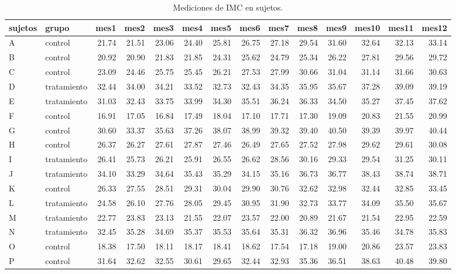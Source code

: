 \documentclass[]{article}
\begin{document}
\begin{table}[ht]
\centering
{\tiny
\begin{tabular}{llrrrrrrrrrrrr}
  \hline
sujetos & grupo & mes1 & mes2 & mes3 & mes4 & mes5 & mes6 & mes7 & mes8 & mes9 & mes10 & mes11 & mes12 \\ 
  \hline
A & control & 21.74 & 21.51 & 23.06 & 24.40 & 25.81 & 26.75 & 27.18 & 29.54 & 31.60 & 32.64 & 32.13 & 33.14 \\ 
  B & control & 20.92 & 20.90 & 21.83 & 21.85 & 24.31 & 25.62 & 24.79 & 25.34 & 26.22 & 27.81 & 29.56 & 29.72 \\ 
  C & control & 23.09 & 24.46 & 25.75 & 25.45 & 26.21 & 27.53 & 27.99 & 30.66 & 31.04 & 31.14 & 31.66 & 30.63 \\ 
  D & tratamiento & 32.44 & 34.00 & 34.21 & 33.52 & 32.73 & 32.43 & 34.35 & 35.95 & 35.67 & 37.28 & 39.09 & 39.19 \\ 
  E & tratamiento & 31.03 & 32.43 & 33.75 & 33.99 & 34.30 & 35.51 & 36.24 & 36.33 & 34.50 & 35.27 & 37.45 & 37.62 \\ 
  F & control & 16.91 & 17.05 & 16.84 & 17.49 & 18.04 & 17.10 & 17.71 & 17.30 & 19.09 & 20.83 & 21.55 & 20.99 \\ 
  G & control & 30.60 & 33.37 & 35.63 & 37.26 & 38.07 & 38.99 & 39.32 & 39.40 & 40.50 & 39.39 & 39.97 & 40.44 \\ 
  H & control & 26.37 & 26.27 & 27.61 & 27.87 & 27.46 & 26.49 & 27.65 & 27.52 & 27.98 & 29.62 & 29.61 & 30.08 \\ 
  I & tratamiento & 26.41 & 25.73 & 26.21 & 25.91 & 26.55 & 26.62 & 28.56 & 30.16 & 29.33 & 29.54 & 31.25 & 30.11 \\ 
  J & tratamiento & 34.10 & 33.29 & 34.64 & 35.43 & 35.29 & 34.15 & 35.16 & 36.73 & 36.77 & 38.43 & 38.74 & 38.71 \\ 
  K & control & 26.33 & 27.55 & 28.51 & 29.31 & 30.04 & 29.90 & 30.76 & 32.62 & 32.98 & 32.44 & 32.85 & 33.45 \\ 
  L & tratamiento & 24.58 & 26.10 & 27.76 & 28.05 & 29.45 & 30.95 & 31.90 & 32.73 & 33.77 & 34.09 & 35.50 & 35.67 \\ 
  M & tratamiento & 22.77 & 23.83 & 23.13 & 21.55 & 22.07 & 23.57 & 22.00 & 20.89 & 21.67 & 21.54 & 22.95 & 22.59 \\ 
  N & tratamiento & 32.45 & 35.28 & 34.69 & 35.37 & 35.53 & 35.64 & 35.31 & 36.32 & 36.96 & 35.46 & 34.78 & 35.83 \\ 
  O & control & 18.38 & 17.50 & 18.11 & 18.17 & 18.41 & 18.62 & 17.54 & 17.18 & 19.00 & 20.86 & 23.57 & 23.83 \\ 
  P & control & 31.64 & 32.62 & 32.55 & 30.61 & 29.65 & 32.44 & 32.93 & 35.36 & 36.51 & 38.63 & 40.48 & 39.80 \\ 
   \hline
\end{tabular}
}
\caption{Mediciones de IMC en sujetos.} 
\label{tab:sujetos}
\end{table}
\end{document}
